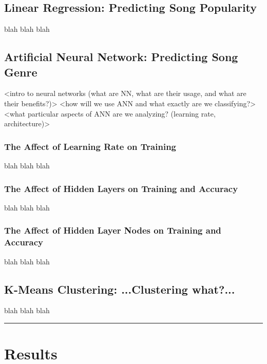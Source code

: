 \documentclass[12pt]{article}
\newcommand{\horizontalLine}{
	\begin{center}
		\hrule width 1.0\textwidth
	\end{center}
}
\begin{document}
\subsection{Linear Regression: Predicting Song Popularity}
\label{subsec:linearRegression}
blah blah blah

\subsection{Artificial Neural Network: Predicting Song Genre}
\label{subsec:ann}
<intro to neural networks (what are NN, what are their usage, and what are their benefits?)>
<how will we use ANN and what exactly are we classifying?>
<what particular aspects of ANN are we analyzing? (learning rate, architecture)>

\subsubsection{The Affect of Learning Rate on Training}
\label{subsubsec:annLearningRate}
blah blah blah

\subsubsection{The Affect of Hidden Layers on Training and Accuracy}
\label{subsubsec:annHiddenLayer}
blah blah blah

\subsubsection{The Affect of Hidden Layer Nodes on Training and Accuracy}
\label{subsubsec:annHiddenLayerNodes}
blah blah blah

\subsection{K-Means Clustering: ...Clustering what?...}
\label{subsec:kMeans}
blah blah blah

\horizontalLine
\section{Results}
\label{sec:results}
\end{document}
